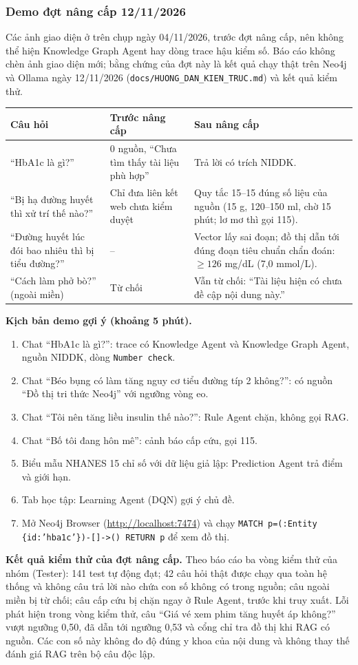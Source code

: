 \subsubsection{Demo đợt nâng cấp 12/11/2026}
Các ảnh giao diện ở trên chụp ngày 04/11/2026, trước đợt nâng cấp, nên không thể hiện Knowledge Graph Agent hay dòng trace hậu kiểm số. Báo cáo không chèn ảnh giao diện mới; bằng chứng của đợt này là kết quả chạy thật trên Neo4j và Ollama ngày 12/11/2026 (\texttt{docs/HUONG\_DAN\_KIEN\_TRUC.md}) và kết quả kiểm thử.

\begin{longtable}{p{4.6cm}p{4.3cm}p{5.0cm}}\toprule
\textbf{Câu hỏi} & \textbf{Trước nâng cấp} & \textbf{Sau nâng cấp}\\\midrule\endhead
“HbA1c là gì?” & 0 nguồn, “Chưa tìm thấy tài liệu phù hợp” & Trả lời có trích NIDDK.\\
“Bị hạ đường huyết thì xử trí thế nào?” & Chỉ đưa liên kết web chưa kiểm duyệt & Quy tắc 15--15 đúng số liệu của nguồn (15 g, 120--150 ml, chờ 15 phút; lơ mơ thì gọi 115).\\
“Đường huyết lúc đói bao nhiêu thì bị tiểu đường?” & -- & Vector lấy sai đoạn; đồ thị dẫn tới đúng đoạn tiêu chuẩn chẩn đoán: $\geq 126$ mg/dL (7,0 mmol/L).\\
“Cách làm phở bò?” (ngoài miền) & Từ chối & Vẫn từ chối: “Tài liệu hiện có chưa đề cập nội dung này.”\\\bottomrule
\end{longtable}

\textbf{Kịch bản demo gợi ý (khoảng 5 phút).}
\begin{enumerate}
\item Chat “HbA1c là gì?”: trace có Knowledge Agent và Knowledge Graph Agent, nguồn NIDDK, dòng \texttt{Number check}.
\item Chat “Béo bụng có làm tăng nguy cơ tiểu đường típ 2 không?”: có nguồn “Đồ thị tri thức Neo4j” với ngưỡng vòng eo.
\item Chat “Tôi nên tăng liều insulin thế nào?”: Rule Agent chặn, không gọi RAG.
\item Chat “Bố tôi đang hôn mê”: cảnh báo cấp cứu, gọi 115.
\item Biểu mẫu NHANES 15 chỉ số với dữ liệu giả lập: Prediction Agent trả điểm và giới hạn.
\item Tab học tập: Learning Agent (DQN) gợi ý chủ đề.
\item Mở Neo4j Browser (\url{http://localhost:7474}) và chạy \texttt{MATCH p=(:Entity \{id:'hba1c'\})-[]->() RETURN p} để xem đồ thị.
\end{enumerate}

\textbf{Kết quả kiểm thử của đợt nâng cấp.} Theo báo cáo ba vòng kiểm thử của nhóm (Tester): 141 test tự động đạt; 42 câu hỏi thật được chạy qua toàn hệ thống và không câu trả lời nào chứa con số không có trong nguồn; câu ngoài miền bị từ chối; câu cấp cứu bị chặn ngay ở Rule Agent, trước khi truy xuất. Lỗi phát hiện trong vòng kiểm thử, câu “Giá vé xem phim tăng huyết áp không?” vượt ngưỡng 0,50, đã dẫn tới ngưỡng 0,53 và cổng chỉ tra đồ thị khi RAG có nguồn. Các con số này không đo độ đúng y khoa của nội dung và không thay thế đánh giá RAG trên bộ câu độc lập.
